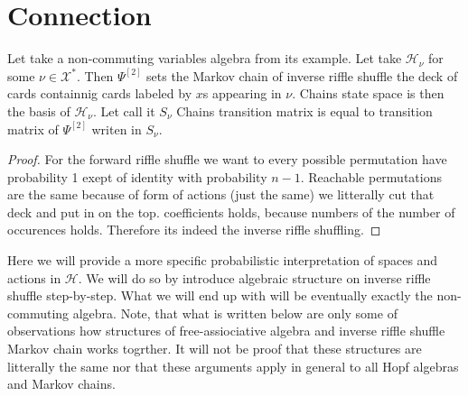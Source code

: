 \documentclass[a4paper, 12pt]{report}
\begin{document}
\chapter{Connection}
Let take a non-commuting variables algebra from its example. Let take $\mathcal{H}_\nu$ for some 
$\nu \in \mathcal{X}^*$. Then $\Psi^{[2]}$ sets the Markov chain of inverse riffle shuffle the deck of cards 
containnig cards labeled by $x$s appearing in $\nu$. Chains state space is then the basis of 
$\mathcal{H}_\nu$. Let call it $S_\nu$ 
Chains transition matrix is equal to transition matrix of $\Psi^{[2]}$ writen in $S_\nu$.  \\
\begin{proof}
For the forward riffle shuffle we want to every possible permutation have probability 1 exept of identity 
with probability $n-1$. Reachable permutations are the same because of form of actions (just the same)
we litterally cut that deck and put in on the top. coefficients holds, because numbers of the number of 
occurences holds. Therefore its indeed the inverse riffle shuffling.
\end{proof}

Here we will provide a more specific probabilistic interpretation of spaces and actions in $\mathcal{H}$.
We will do so by introduce algebraic structure on inverse riffle shuffle step-by-step. What we will end 
up with will be eventually exactly the non-commuting algebra. Note, that what is written below are only 
some of observations how structures of free-assiociative algebra and inverse riffle shuffle Markov chain 
works togrther. It will not be proof that these structures are litterally the same nor that these arguments 
apply  in general to all Hopf algebras and Markov chains.\\[4pt]
\end{document}
